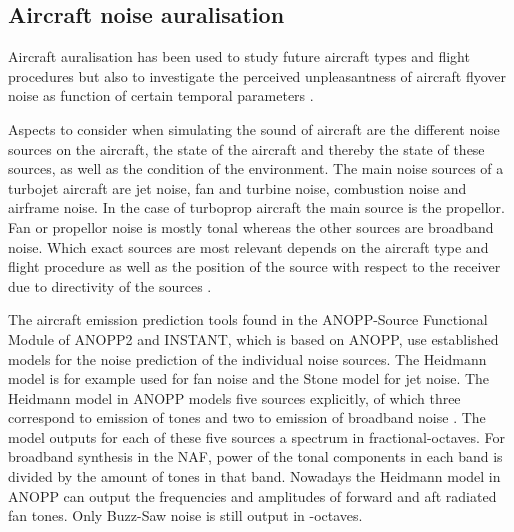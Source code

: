 
\subsection{Aircraft noise auralisation} 

Aircraft auralisation has been used to study future aircraft types
\cite{Rizzi2013,Rizzi2016,Rizzi2016a} and flight procedures \cite{Sahai2016} but
also to investigate the perceived unpleasantness of aircraft flyover noise as
function of certain temporal parameters \cite{Pate2017}.

Aspects to consider when simulating the sound of aircraft are the different
noise sources on the aircraft, the state of the aircraft and thereby the state
of these sources, as well as the condition of the environment.
The main noise sources of a turbojet aircraft are jet noise, fan and turbine
noise, combustion noise and airframe noise. In the case of turboprop aircraft
the main source is the propellor\cite{Zaporozhets2011}. Fan or propellor noise
is mostly tonal whereas the other sources are broadband noise.
Which exact sources are most relevant depends on the aircraft type and flight
procedure as well as the position of the source with respect to the receiver due
to directivity of the sources \cite{Bertsch2015}.

The aircraft emission prediction tools found in the ANOPP-Source Functional
Module of ANOPP2 \cite{Lopes2016, Tuttle2017} and INSTANT\cite{Sahai2016b}, which is based
on ANOPP, use established models for the noise prediction of the individual
noise sources. The Heidmann model is for example used for fan noise and the
Stone model for jet noise. The Heidmann model in ANOPP models
five sources explicitly, of which three correspond to emission of tones and two
to emission of broadband noise \cite{Arntzen2014a}. The model outputs for each
of these five sources a spectrum in fractional-octaves.
For broadband synthesis in the NAF\cite{Aumann2015}, power of the tonal
components in each band is divided by the amount of tones in that band.
Nowadays the Heidmann model in ANOPP can output the frequencies and amplitudes
of forward and aft radiated fan tones. Only Buzz-Saw noise is still output in
-octaves.

